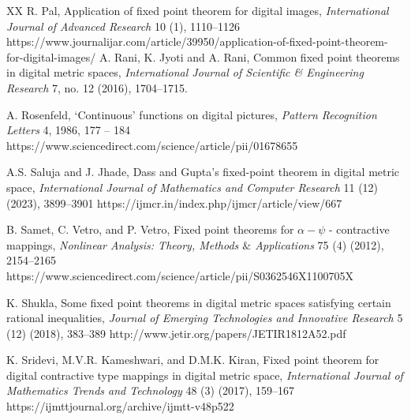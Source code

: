 \documentclass{article}
\numberwithin{thm}{section}
\begin{document}
\begin{thebibliography}{XX}
R. Pal,
Application of fixed point theorem for digital images,
{\em International Journal of Advanced Research}
10 (1), 1110--1126
\newline
https://www.journalijar.com/article/39950/application-of-fixed-point-theorem-for-digital-images/
 A. Rani, K. Jyoti and A. Rani, Common fixed point theorems in digital metric spaces,
{\em International Journal of Scientific \& Engineering Research} 7, no. 12 (2016), 1704--1715.

A. Rosenfeld, `Continuous' functions on digital pictures, 
{\em Pattern Recognition Letters} 4, 1986, 177 -- 184
\newline
https://www.sciencedirect.com/science/article/pii/01678655

A.S. Saluja and J. Jhade,
Dass and Gupta's 
fixed-point theorem in digital metric space,
{\em International 
Journal of Mathematics
and Computer Research}
11 (12) (2023), 3899--3901
\newline
https://ijmcr.in/index.php/ijmcr/article/view/667

B. Samet, C. Vetro, and P. Vetro, 
Fixed point theorems for $\alpha - \psi$  -
contractive mappings, 
{\em Nonlinear Analysis: Theory, Methods 
$\&$ Applications} 75 (4) (2012), 2154--2165
\newline
https://www.sciencedirect.com/science/article/pii/S0362546X1100705X

K. Shukla,
Some fixed point theorems in digital 
metric spaces satisfying certain 
rational inequalities,
{\em Journal of Emerging Technologies and Innovative Research}
5 (12) (2018), 383--389
\newline 
http://www.jetir.org/papers/JETIR1812A52.pdf 

K. Sridevi, M.V.R. Kameshwari, and D.M.K. Kiran, Fixed point theorem for digital contractive
type mappings in digital metric space, {\em International Journal of Mathematics Trends and Technology} 48 
(3) (2017), 159--167 
\newline
https://ijmttjournal.org/archive/ijmtt-v48p522

\end{thebibliography}
\end{document}
